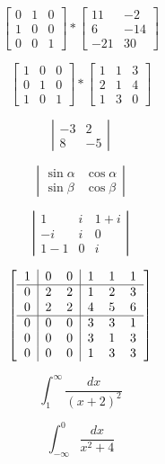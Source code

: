 \documentclass[11pt, a4paper]{article}
\begin{document}
$$
\left[\begin{array}{ccc}
    0 & 1 & 0 \\
    1 & 0 & 0 \\
    0 & 0 & 1
\end{array}\right]
*
\left[\begin{array}{cc}
    11 & -2 \\
    6 & -14 \\
    -21 & 30
\end{array}\right]
$$

$$
\left[\begin{array}{ccc}
    1 & 0 & 0 \\
    0 & 1 & 0 \\
    1 & 0 & 1
\end{array}\right]
*
\left[\begin{array}{ccc}
    1 & 1 & 3 \\
    2 & 1 & 4 \\
    1 & 3 & 0
\end{array}\right]
$$

$$
\left|\begin{array}{cc}
    -3 & 2 \\
    8 & -5
\end{array}\right|
$$

$$
\left|\begin{array}{cc}
    \sin{\alpha} & \cos{\alpha} \\
    \sin{\beta} & \cos{\beta}
\end{array}\right|
$$

$$
\left|\begin{array}{ccc}
    1 & i & 1+i \\
    -i & i & 0 \\
    1-1 & 0 & i
\end{array}\right|
$$

$$\left[\begin{tabular}{c|c c|c c c}
    1 & 0 & 0 & 1 & 1 & 1 \\
    \hline
    0 & 2 & 2 & 1 & 2 & 3 \\
    0 & 2 & 2 & 4 & 5 & 6 \\
    \hline
    0 & 0 & 0 & 3 & 3 & 1 \\
    0 & 0 & 0 & 3 & 1 & 3 \\
    0 & 0 & 0 & 1 & 3 & 3
\end{tabular}\right]$$

$$
\int_{1}^{\infty} \frac{dx}{(x+2)^2}
$$

$$
\int_{-\infty}^{0} \frac{dx}{x^2 + 4}
$$
\end{document}
